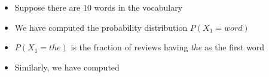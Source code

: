 \begin{frame}[shrink=5]
\begin{columns}
\begin{overlayarea}{\textwidth}{\textheight}
{				%
			}
		\end{overlayarea}
		\begin{overlayarea}{\textwidth}{\textheight}
			\begin{itemize}\justifying
				\item<1-> Suppose there are $10$ words in the vocabulary 
				\item<2-> We have computed the probability distribution $P(X_1=word)$
				\item<3-> $P(X_1=the)$ is the fraction of reviews having \textit{the} as the first word
				\item<4-> Similarly, we have computed \\

\end{itemize}
\end{overlayarea}
\end{columns}
\end{frame}
